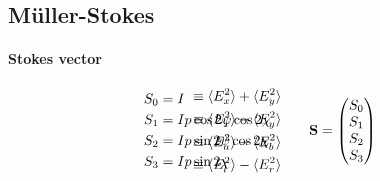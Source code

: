\subsection{M\"uller-Stokes}\label{sec:Mueller-Stokes}
% 
\paragraph{Stokes vector}
\begin{align}
\begin{split}
S_0 &= I \\
S_1 &= I p \cos 2\psi \cos 2\chi \\
S_2 &= I p \sin 2\psi \cos 2\chi \\
S_3 &= I p \sin 2\chi
\end{split} \hspace{-6em}
\begin{split}
& \equiv \langle E_x^{2} \rangle + \langle E_y^{2} \rangle \\
& \equiv \langle E_x^{2} \rangle - \langle E_y^{2} \rangle \\
& \equiv \langle E_a^{2} \rangle - \langle E_b^{2} \rangle \\
& \equiv  \langle E_l^{2} \rangle - \langle E_r^{2} \rangle
\end{split}
\hspace{2em}
\mathbf{S} =
\begin{pmatrix} S_0 \\ S_1 \\ S_2 \\ S_3\end{pmatrix}
\end{align}
% 
% 
